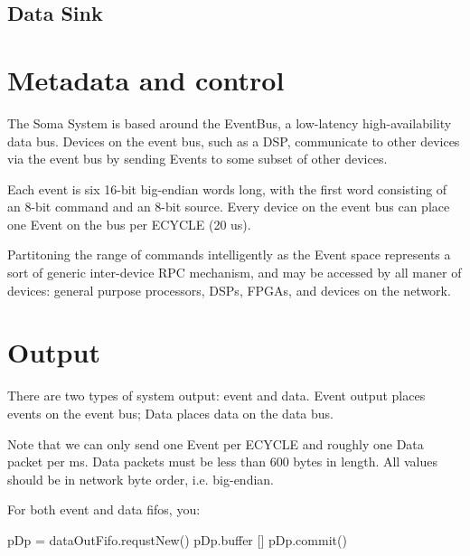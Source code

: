 \subsection{Data Sink}


\section{Metadata and control}
The Soma System is based around the EventBus, a low-latency
high-availability data bus. Devices on the event bus, such as a DSP,
communicate to other devices via the event bus by sending Events to
some subset of other devices.

Each event is six 16-bit big-endian words long, with the first word
consisting of an 8-bit command and an 8-bit source. Every device on
the event bus can place one Event on the bus per ECYCLE (20 us).

Partitoning the range of commands intelligently as the Event space
represents a sort of generic inter-device RPC mechanism, and may be
accessed by all maner of devices: general purpose processors, DSPs,
FPGAs, and devices on the network.


\section{Output} 
There are two types of system output: event and data. Event output
places events on the event bus; Data places data on the data bus.

Note that we can only send one Event per ECYCLE and roughly one Data
packet per ms. Data packets must be less than 600 bytes in length. All
values should be in network byte order, i.e. big-endian. 

For both event and data fifos, you: 

pDp = dataOutFifo.requstNew()
pDp.buffer []
pDp.commit()
